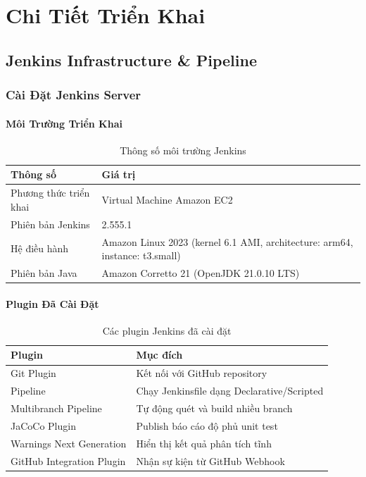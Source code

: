 \section{Chi Tiết Triển Khai}

\subsection{Jenkins Infrastructure \& Pipeline}

\subsubsection{Cài Đặt Jenkins Server}

\paragraph{Môi Trường Triển Khai}

\begin{table}[H]
\centering
\caption{Thông số môi trường Jenkins}
\begin{tabular}{|l|p{9cm}|}
\hline
\textbf{Thông số} & \textbf{Giá trị} \\
\hline
Phương thức triển khai & Virtual Machine Amazon EC2 \\
\hline
Phiên bản Jenkins & 2.555.1 \\
\hline
Hệ điều hành & Amazon Linux 2023 (kernel 6.1 AMI, architecture: arm64, instance: t3.small) \\
\hline
Phiên bản Java & Amazon Corretto 21 (OpenJDK 21.0.10 LTS) \\
\hline
\end{tabular}
\end{table}

\paragraph{Plugin Đã Cài Đặt}

\begin{table}[H]
\centering
\caption{Các plugin Jenkins đã cài đặt}
\begin{tabular}{|l|l|}
\hline
\textbf{Plugin} & \textbf{Mục đích} \\
\hline
Git Plugin & Kết nối với GitHub repository \\
\hline
Pipeline & Chạy Jenkinsfile dạng Declarative/Scripted \\
\hline
Multibranch Pipeline & Tự động quét và build nhiều branch \\
\hline
JaCoCo Plugin & Publish báo cáo độ phủ unit test \\
\hline
Warnings Next Generation & Hiển thị kết quả phân tích tĩnh \\
\hline
GitHub Integration Plugin & Nhận sự kiện từ GitHub Webhook \\
\hline
\end{tabular}
\end{table}

